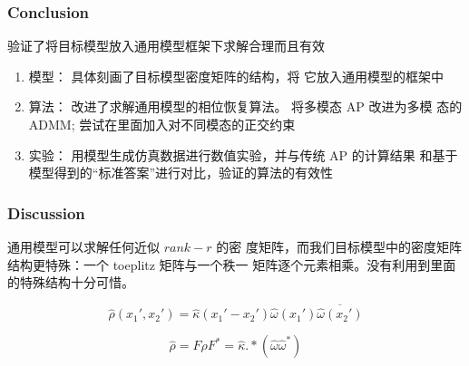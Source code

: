 \documentclass[UTF8]{beamer}
\begin{document}
\begin{frame} \frametitle{Conclusion}


验证了将目标模型放入通用模型框架下求解合理而且有效

\begin{enumerate}
\item 模型： 具体刻画了目标模型密度矩阵的结构，将
它放入通用模型的框架中

\item 算法： 改进了求解通用模型的相位恢复算法。
 将多模态 AP 改进为多模
态的 ADMM; 尝试在里面加入对不同模态的正交约束

\item 实验： 用模型生成仿真数据进行数值实验，并与传统 AP 的计算结果
和基于模型得到的“标准答案”进行对比，验证的算法的有效性
\end{enumerate}

\end{frame}

\begin{frame} \frametitle{Discussion}



 通用模型可以求解任何近似 $rank-r$ 的密
度矩阵，而我们目标模型中的密度矩阵结构更特殊：一个 toeplitz 矩阵与一个秩一
矩阵逐个元素相乘。没有利用到里面的特殊结构十分可惜。

$$
\widehat{\rho}(x_1',x_2') =  \hat{\kappa}(x_1'-x_2')\widehat{\omega}(x_1') \overline{\widehat{\omega}(x_2')}
$$


$$
\hat{\rho} = F \rho F^* = \hat{\kappa} .* (\hat{\omega} \hat{\omega}^*)
$$
	
\end{frame}
\end{document}
